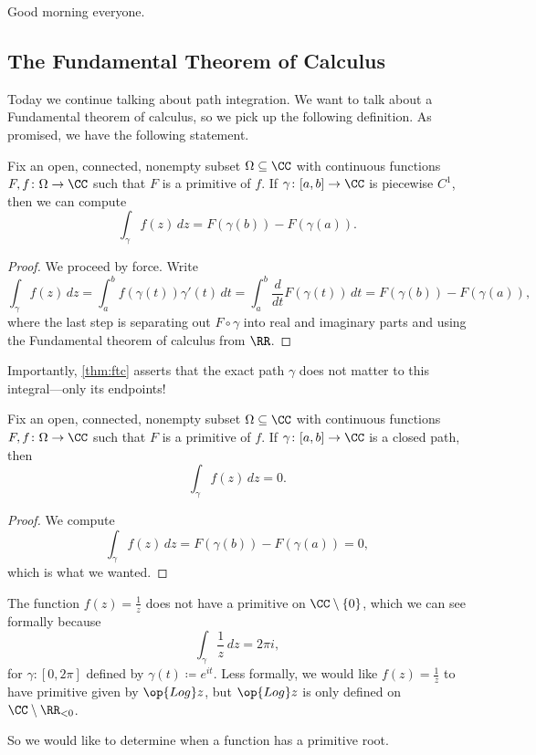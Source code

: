 \documentclass[../notes.tex]{subfiles}
\begin{document}

Good morning everyone.

\subsection{The Fundamental Theorem of Calculus}
Today we continue talking about path integration. We want to talk about a Fundamental theorem of calculus, so we pick up the following definition.
\primitivedef*
\noindent As promised, we have the following statement.
\begin{theorem} \label{thm:ftc}
	Fix an open, connected, nonempty subset $\Omega\subseteq\CC$ with continuous functions $F,f\colon \Omega\to\CC$ such that $F$ is a primitive of $f$. If $\gamma\colon [a,b]\to\CC$ is piecewise $C^1$, then we can compute
	\[\int_\gamma f(z)\,dz=F(\gamma(b))-F(\gamma(a)).\]
\end{theorem}
\begin{proof}
	We proceed by force. Write
	\[\int_\gamma f(z)\,dz=\int_a^b f(\gamma(t))\gamma'(t)\,dt=\int_a^b\frac d{dt}F(\gamma(t))\,dt=F(\gamma(b))-F(\gamma(a)),\]
	where the last step is separating out $F\circ\gamma$ into real and imaginary parts and using the Fundamental theorem of calculus from $\RR$.
\end{proof}
\begin{remark}
	Importantly, \autoref{thm:ftc} asserts that the exact path $\gamma$ does not matter to this integral---only its endpoints!
\end{remark}
\begin{corollary} \label{cor:ftconclosed}
	Fix an open, connected, nonempty subset $\Omega\subseteq\CC$ with continuous functions $F,f\colon \Omega\to\CC$ such that $F$ is a primitive of $f$. If $\gamma\colon [a,b]\to\CC$ is a closed path, then
	\[\int_\gamma f(z)\,dz=0.\]
\end{corollary}
\begin{proof}
	We compute
	\[\int_\gamma f(z)\,dz=F(\gamma(b))-F(\gamma(a))=0,\]
	which is what we wanted.
\end{proof}
\begin{example}
	The function $f(z)=\frac1z$ does not have a primitive on $\CC\setminus\{0\}$, which we can see formally because
	\[\int_\gamma\frac1z\,dz=2\pi i,\]
	for $\gamma\colon [0,2\pi]$ defined by $\gamma(t)\coloneqq e^{it}$. Less formally, we would like $f(z)=\frac1z$ to have primitive given by $\op{Log}z$, but $\op{Log}z$ is only defined on $\CC\setminus\RR_{<0}$.
\end{example}
So we would like to determine when a function has a primitive root.
\end{document}
